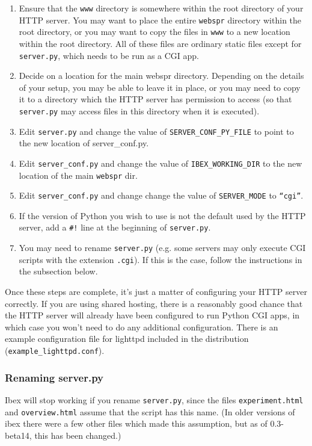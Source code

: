 \documentclass[11pt,letterpaper]{article}
\begin{document}
\begin{enumerate}

\item
 Ensure that the \texttt{www} directory is somewhere within the root directory of your HTTP server. You may want to place the entire \texttt{webspr} directory within the root directory, or you may want to copy the files in \texttt{www} to a new location within the root directory. All of these files are ordinary static files except for \texttt{server.py}, which needs to be run as a CGI app.
\item
 Decide on a location for the main webspr directory. Depending on the details of your setup, you may be able to leave it in place, or you may need to copy it to a directory which the HTTP server has permission to access (so that \texttt{server.py} may access files in this directory when it is executed).
\item
 Edit \texttt{server.py} and change the value of \texttt{SERVER\_CONF\_PY\_FILE} to point to the new location of server\_conf.py.
\item
 Edit \texttt{server\_conf.py} and change the value of \texttt{IBEX\_WORKING\_DIR} to the new location of the main \texttt{webspr} dir.
\item
 Edit \texttt{server\_conf.py} and change change the value of \texttt{SERVER\_MODE} to \texttt{``cgi''}.
\item
 If the version of Python you wish to use is not the default used by the HTTP server, add a \texttt{\#!} line at the beginning of \texttt{server.py}.
\item
 You may need to rename \texttt{server.py} (e.g. some servers may only execute CGI scripts with the extension \texttt{.cgi}). If this is the case, follow the instructions in the subsection below.
\end{enumerate}
Once these steps are complete, it's just a matter of configuring your HTTP
server correctly. If you are using shared hosting, there is a reasonably good
chance that the HTTP server will already have been configured to run Python CGI
apps, in which case you won't need to do any additional configuration. There is
an example configuration file for lighttpd included in the distribution
(\texttt{example\_lighttpd.conf}).

\subsubsection{Renaming server.py}

Ibex will stop working if you rename \texttt{server.py}, since the files \texttt{experiment.html} and \texttt{overview.html}
assume that the script has this name. (In older versions of ibex there were a few other files which
made this assumption, but as of 0.3-beta14, this has been changed.)
\end{document}
